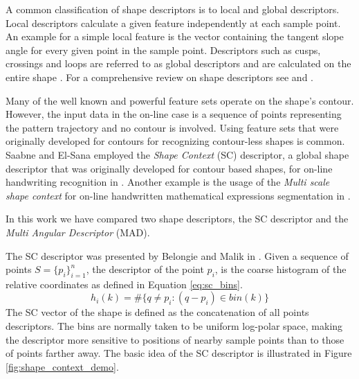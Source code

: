 \iftoggle{edit-mode}{\hspace{0pt}\marginpar{Shape descriptors types}}{}
A common classification of shape descriptors is to local and global descriptors. 
Local descriptors calculate a given feature independently at each sample point. 
An example for a simple local feature is the vector containing the tangent slope angle for every given point in the sample point.
Descriptors such as cusps, crossings and loops are referred to as global descriptors and are calculated on the entire shape \cite{hu1997combining}. 
For a comprehensive review on shape descriptors see \cite{zhang2004review} and \cite{yang2008survey}.

\iftoggle{edit-mode}{\hspace{0pt}\marginpar{Using off-line shape descriptors for on-line HWR}}{}
Many of the well known and powerful feature sets operate on the shape's contour.  
However, the input data in the on-line case is a sequence of points representing the pattern trajectory and no contour is involved. 
Using feature sets that were originally developed for contours for recognizing contour-less shapes is common. 
Saabne and El-Sana employed the \emph{Shape Context} (SC) descriptor, a global shape descriptor that was originally developed for contour based shapes, for on-line handwriting recognition in \cite{saabni2009hierarchical}. 
Another example is the usage of the \emph{Multi scale shape context} for on-line handwritten mathematical expressions segmentation in \cite{husegmenting}. 

\iftoggle{edit-mode}{\hspace{0pt}\marginpar{Selected Descriptors}}{}
In this work we have compared two shape descriptors, the SC descriptor and the \emph{Multi Angular Descriptor} (MAD). 

\iftoggle{edit-mode}{\hspace{0pt}\marginpar{Shape Context}}{}
The SC descriptor was presented by Belongie and Malik in \cite{belongie2002shape}.
Given a sequence of points $S=\{p_i\}_{i=1}^n$, the descriptor of the point ${p_i}$, is the coarse histogram of the relative coordinates as defined in Equation \ref{eq:sc_bins}.
\begin{equation}
{h_i}(k) = \# \{q \ne p_i:(q - p_i) \in bin(k) \}
\label{eq:sc_bins}
\end{equation}
The SC vector of the shape is defined as the concatenation of all points descriptors.
The bins are normally taken to be uniform log-polar space, making the descriptor more sensitive to positions of nearby sample points than to those of points farther away. 
The basic idea of the SC descriptor is illustrated in Figure \ref{fig:shape_context_demo}. 

